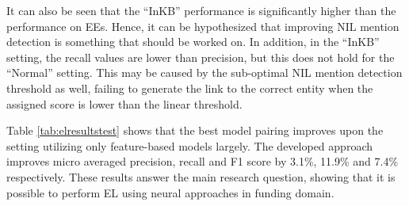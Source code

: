 \documentclass{report}
\theoremstyle{definition}
\theoremstyle{remark}
\begin{document}
It can also be seen that the ``InKB'' performance is significantly higher than the performance on EEs. Hence, it can be hypothesized that improving NIL mention detection is something that should be worked on. In addition, in the ``InKB'' setting, the recall values are lower than precision, but this does not hold for the ``Normal'' setting. This may be caused by the sub-optimal NIL mention detection threshold as well, failing to generate the link to the correct entity when the assigned score is lower than the linear threshold.

Table \ref{tab:elresultstest} shows that the best model pairing improves upon the setting utilizing only feature-based models largely. The developed approach improves micro averaged precision, recall and F1 score by 3.1\%, 11.9\% and 7.4\% respectively. These results answer the main research question, showing that it is possible to perform EL using neural approaches in funding domain.
\end{document}
